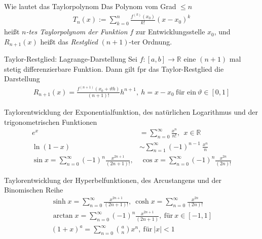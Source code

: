\begin{karte}{Wie lautet das Taylorpolynom}
	Das Polynom vom Grad \(\leq n \)
	\begin{align}
		T_{n}(x):=\sum_{k=0}^n\frac{f^{(k)}(x_{0})}{k!}{(x-x_{0})}^{k}
	\end{align}
	heißt \emph{\(n\)-tes Taylorpolynom der Funktion} \(f\) zur Entwicklungsstelle \(x_0\), und \(R_{n+1}(x)\) heißt das \emph{Restglied} \((n+1)\)-ter Ordnung.
\end{karte}

\begin{karte}{Taylor-Restglied: Lagrange-Darstellung}
	Sei \(f:[a,b]\to\mathbb{R}\) eine \((n+1)\) mal stetig differenzierbare Funktion. Dann gilt fpr das Taylor-Restglied die Darstellung
{\large
	\begin{align}
		R_{n+1}(x)=\frac{f^{(n+1)}(x_{0}+\vartheta h)}{(n+1)!} h^{n+1},\ h=x-x_0\  \text{für ein}\ \vartheta\in[0,1]
	\end{align}
	}
\end{karte}

\begin{karte}{Taylorentwicklung der Exponentialfunktion, des natürlichen Logarithmus und der trigonometrischen Funktionen}
	\begin{align}
		e^{x}&=\sum_{n=0}^{\infty}\frac{x^{n}}{n!},\ \ x\in\mathbb{R}\\
		\ln{(1-x)}&\sim\sum_{n=1}^{\infty}{(-1)}^{n-1}\:\frac{x^{n}}{n}\\
		\sin{x}=\sum_{n=0}^{\infty}{(-1)}^{n}\frac{x^{2n+1}}{(2n+1)!},&\ \cos{x}=\sum_{n=0}^{\infty}{(-1)}^{n}\frac{x^{2n}}{(2n)!}
	\end{align}

\end{karte}

\begin{karte}{Taylorentwicklung der Hyperbelfunktionen, des Arcustangens und der Binomischen Reihe}
	\begin{align}
		\sinh{x}=\sum_{n=0}^{\infty}\frac{x^{2n+1}}{(2n+1)!},\ \cosh{x}=\sum_{n=0}^{\infty}\frac{x^{2n}}{(2n)!}\\
		\arctan{x}=\sum_{n=0}^{\infty}{(-1)}^{n}\frac{x^{2n+1}}{(2n+1)},\ \text{für}\ x\in [-1,1]\\
		{(1+x)}^{a}=\sum_{n=0}^{\infty}\binom{a}{n}x^{n},\ \text{für}\ \lvert x\rvert <1
	\end{align}
\end{karte}
